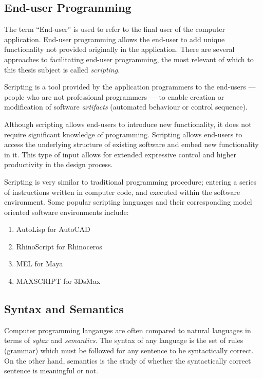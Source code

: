 \subsection{End-user Programming}
\label{sec:EndUserProgramming}

The term ``End-user'' is used to refer to the final user of the computer application. End-user programming  allows the end-user to add unique functionality not provided originally in the application. There are several approaches to facilitating end-user programming, the most relevant of which to this thesis subject is called \emph{scripting}.

Scripting is a tool provided by the application programmers to the end-users --- people who are not professional programmers --- to enable creation or modification of software \emph{artifacts} (automated behaviour or control sequence).

Although scripting allows end-users to introduce new functionality, it does not require significant knowledge of programming. Scripting allows end-users to access the underlying structure of existing software and embed new functionality in it. This type of input allows for extended expressive control and higher productivity in the design process. \cite{kashyap01}

Scripting is very similar to traditional programming procedure; entering a series of instructions written in computer code, and executed within the software environment. Some popular scripting languages and their corresponding model oriented software environments include: 

\vspace{-0.5cm}
\begin{enumerate}[nolistsep]
\item AutoLisp for AutoCAD
\item RhinoScript for Rhinoceros
\item MEL for Maya
\item MAXSCRIPT for 3DsMax
\end{enumerate}

\subsection{Syntax and Semantics}

Computer programming langauges are often compared to natural languages in terms of \emph{sytax} and \emph{semantics}. The syntax of any language is the set of rules (grammar) which must be followed for any sentence to be syntactically correct. On the other hand, semantics is the study of whether the syntactically correct sentence is meaningful or not.

